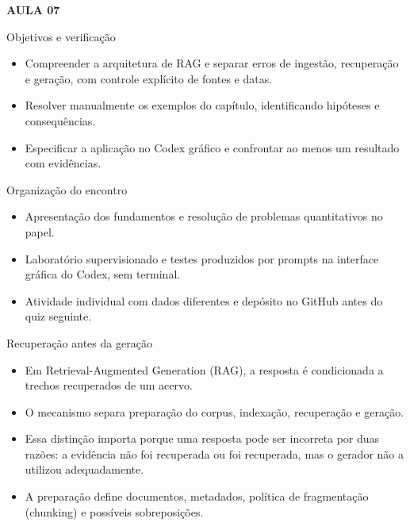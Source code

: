 \documentclass[10pt,aspectratio=169]{beamer}
\begin{document}
\begin{frame}[t]{}
\vspace{14mm}\textcolor{InsperRed}{\bfseries AULA 07}\par\vspace{4mm}{\LARGE\bfseries Retrieval-Augmented Generation}\par\vspace{6mm}{\large Macroeconomia}\par{}
\end{frame}

\begin{frame}[t]{Objetivos e verificação}
\small
\begin{itemize}
\item Compreender a arquitetura de RAG e separar erros de ingestão, recuperação e geração, com controle explícito de fontes e datas.
\item Resolver manualmente os exemplos do capítulo, identificando hipóteses e consequências.
\item Especificar a aplicação no Codex gráfico e confrontar ao menos um resultado com evidências.
\end{itemize}
\end{frame}

\begin{frame}[t]{Organização do encontro}
\small
\begin{itemize}
\item Apresentação dos fundamentos e resolução de problemas quantitativos no papel.
\item Laboratório supervisionado e testes produzidos por prompts na interface gráfica do Codex, sem terminal.
\item Atividade individual com dados diferentes e depósito no GitHub antes do quiz seguinte.
\end{itemize}
\end{frame}

\begin{frame}[t]{Recuperação antes da geração}
\small
\begin{itemize}
\item Em Retrieval-Augmented Generation (RAG), a resposta é condicionada a trechos recuperados de um acervo.
\item O mecanismo separa preparação do corpus, indexação, recuperação e geração.
\item Essa distinção importa porque uma resposta pode ser incorreta por duas razões: a evidência não foi recuperada ou foi recuperada, mas o gerador não a utilizou adequadamente.
\item A preparação define documentos, metadados, política de fragmentação (chunking) e possíveis sobreposições.
\end{itemize}
\end{frame}
\end{document}
